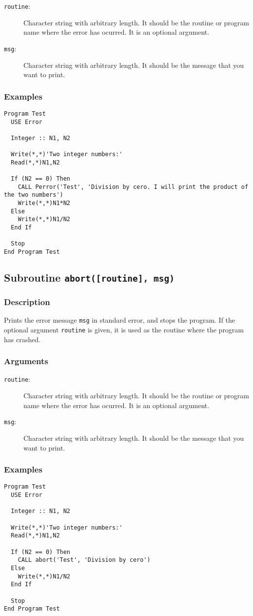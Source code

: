\begin{description}
\item[\texttt{routine}:] Character string with arbitrary length. It
  should be the routine or program name where the error has
  ocurred. It is an optional argument.
\item[\texttt{msg}:] Character string with arbitrary length. It
  should be the message that you want to print.
\end{description}


\subsubsection{Examples}

\begin{verbatim}
Program Test
  USE Error

  Integer :: N1, N2

  Write(*,*)'Two integer numbers:'
  Read(*,*)N1,N2

  If (N2 == 0) Then
    CALL Perror('Test', 'Division by cero. I will print the product of the two numbers')
    Write(*,*)N1*N2
  Else 
    Write(*,*)N1/N2
  End If

  Stop
End Program Test
\end{verbatim}

\subsection{Subroutine \texttt{abort([routine], msg)}}

\subsubsection{Description}

Prints the error message \texttt{msg} in standard error, and stops the
program. If the optional argument \texttt{routine} is given, it is
used as the routine where the program has crashed.

\subsubsection{Arguments}

\begin{description}
\item[\texttt{routine}:] Character string with arbitrary length. It
  should be the routine or program name where the error has
  ocurred. It is an optional argument.
\item[\texttt{msg}:] Character string with arbitrary length. It
  should be the message that you want to print.
\end{description}


\subsubsection{Examples}

\begin{verbatim}
Program Test
  USE Error

  Integer :: N1, N2

  Write(*,*)'Two integer numbers:'
  Read(*,*)N1,N2

  If (N2 == 0) Then
    CALL abort('Test', 'Division by cero')
  Else 
    Write(*,*)N1/N2
  End If

  Stop
End Program Test
\end{verbatim}

